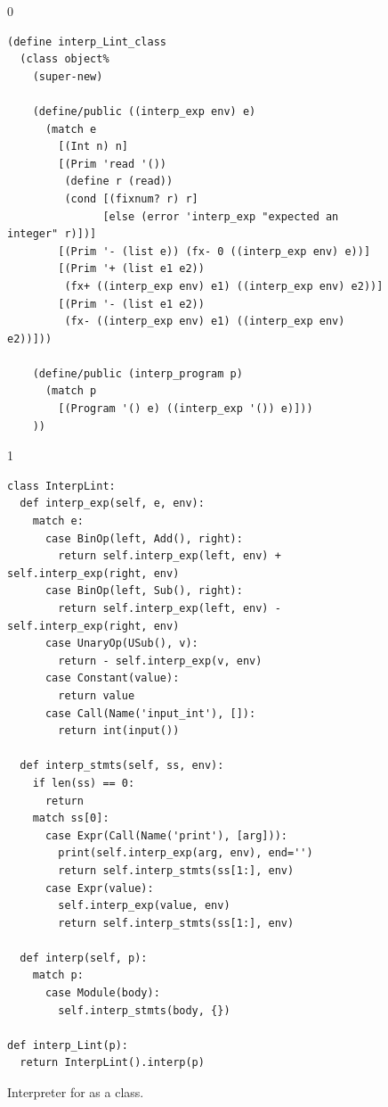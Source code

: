 \documentclass[7x10,nocrop]{TimesAPriori_MIT}%
\def\racketEd{0}
\def\pythonEd{1}
\def\edition{0}
\begin{document}
\begin{figure}[tp]
{\if\edition\racketEd
\begin{lstlisting}
(define interp_Lint_class
  (class object%
    (super-new)
    
    (define/public ((interp_exp env) e)
      (match e
        [(Int n) n]
        [(Prim 'read '())
         (define r (read))
         (cond [(fixnum? r) r]
               [else (error 'interp_exp "expected an integer" r)])]
        [(Prim '- (list e)) (fx- 0 ((interp_exp env) e))]
        [(Prim '+ (list e1 e2))
         (fx+ ((interp_exp env) e1) ((interp_exp env) e2))]
        [(Prim '- (list e1 e2))
         (fx- ((interp_exp env) e1) ((interp_exp env) e2))]))

    (define/public (interp_program p)
      (match p
        [(Program '() e) ((interp_exp '()) e)]))
    ))
\end{lstlisting}
\fi}
{\if\edition\pythonEd
\begin{lstlisting}
class InterpLint:
  def interp_exp(self, e, env):
    match e:
      case BinOp(left, Add(), right):
        return self.interp_exp(left, env) + self.interp_exp(right, env)
      case BinOp(left, Sub(), right):
        return self.interp_exp(left, env) - self.interp_exp(right, env)
      case UnaryOp(USub(), v):
        return - self.interp_exp(v, env)
      case Constant(value):
        return value
      case Call(Name('input_int'), []):
        return int(input())            

  def interp_stmts(self, ss, env):
    if len(ss) == 0:
      return
    match ss[0]:
      case Expr(Call(Name('print'), [arg])):
        print(self.interp_exp(arg, env), end='')
        return self.interp_stmts(ss[1:], env)
      case Expr(value):
        self.interp_exp(value, env)
        return self.interp_stmts(ss[1:], env)

  def interp(self, p):
    match p:
      case Module(body):
        self.interp_stmts(body, {})

def interp_Lint(p):
  return InterpLint().interp(p)
\end{lstlisting}
\fi}
\caption{Interpreter for \LangInt{} as a class.}
\label{fig:interp-Lint-class}
\end{figure}
\end{document}
